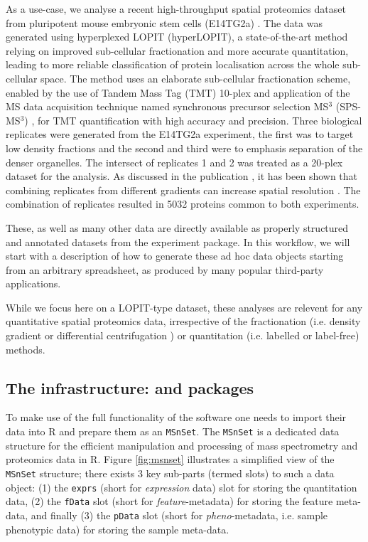 As a use-case, we analyse a recent high-throughput spatial proteomics
dataset from pluripotent mouse embryonic stem cells (E14TG2a)
\cite{hyper}. The data was generated using hyperplexed LOPIT
(hyperLOPIT), a state-of-the-art method relying on improved
sub-cellular fractionation and more accurate quantitation, leading to
more reliable classification of protein localisation across the whole
sub-cellular space. The method uses an elaborate sub-cellular
fractionation scheme, enabled by the use of Tandem Mass Tag (TMT)
\cite{Thompson:2003} 10-plex and application of the MS data
acquisition technique named synchronous precursor selection MS$^3$
(SPS-MS$^3$) \cite{McAlister:2014}, for TMT quantification with high
accuracy and precision. Three biological replicates were generated
from the E14TG2a experiment, the first was to target low density
fractions and the second and third were to emphasis separation of the
denser organelles.  The intersect of replicates 1 and 2 was treated as
a 20-plex dataset for the analysis.  As discussed in the publication
\cite{hyper}, it has been shown that combining replicates from
different gradients can increase spatial resolution
\cite{Trotter:2010}. The combination of replicates resulted in 5032
proteins common to both experiments.

These, as well as many other data are directly available as properly
structured and annotated datasets from the 
experiment package. In this workflow, we will start with a description
of how to generate these ad hoc data objects starting from an
arbitrary spreadsheet, as produced by many popular third-party
applications.

While we focus here on a LOPIT-type dataset, these analyses are
relevent for any quantitative spatial proteomics data,  
irrespective of the fractionation (i.e. density gradient or 
differential centrifugation \cite{Itzhak:2016}) or quantitation 
(i.e. labelled or label-free) methods.

\subsection*{The infrastructure:  and  packages}

To make use of the full functionality of the  software
one needs to import their data into R and prepare them as an
\texttt{MSnSet}. The \texttt{MSnSet} is a dedicated data structure for
the efficient manipulation and processing of mass spectrometry and
proteomics data in R. Figure \ref{fig:msnset} illustrates a simplified view of the
\texttt{MSnSet} structure; there exists 3 key sub-parts (termed slots)
to such a data object: (1) the \texttt{exprs} (short for
\textit{expression} data) slot for storing the quantitation data, (2)
the \texttt{fData} slot (short for \textit{feature}-metadata) for
storing the feature meta-data, and finally (3) the \texttt{pData} slot
(short for \textit{pheno}-metadata, i.e. sample phenotypic data) for
storing the sample meta-data.

